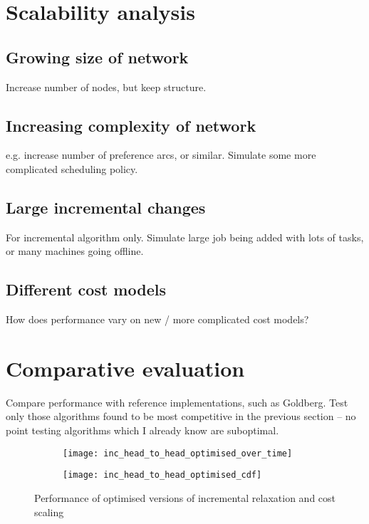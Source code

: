 \section{Scalability analysis}

\subsection{Growing size of network}

Increase number of nodes, but keep structure.

\subsection{Increasing complexity of network}

e.g. increase number of preference arcs, or similar. Simulate some more complicated scheduling policy.

\subsection{Large incremental changes}

For incremental algorithm only. Simulate large job being added with lots of tasks, or many machines going offline.

\subsection{Different cost models}

How does performance vary on new / more complicated cost models?

\section{Comparative evaluation} \label{sec:eval-comparative}

Compare performance with reference implementations, such as Goldberg. Test only those algorithms found to be most competitive in the previous section -- no point testing algorithms which I already know are suboptimal.

\begin{figure}
    \centering
    \begin{subfigure}[c]{0.45\textwidth}
        \texttt{[image: inc\_head\_to\_head\_optimised\_over\_time]}
    \end{subfigure}
    \begin{subfigure}[c]{0.45\textwidth}
        \texttt{[image: inc\_head\_to\_head\_optimised\_cdf]}
    \end{subfigure}
    \caption{Performance of optimised versions of incremental relaxation and cost scaling}
    \label{fig:inc-head-to-head-optimised}
\end{figure}

